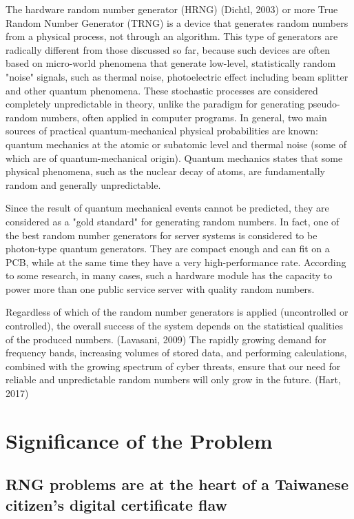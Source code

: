 \documentclass[runningheads]{llncs}
\begin{document}
The hardware random number generator (HRNG) (Dichtl, 2003) or more True Random Number Generator (TRNG) is a device that generates random numbers from a physical process, not through an algorithm. This type of generators are radically different from those discussed so far, because such devices are often based on micro-world phenomena that generate low-level, statistically random "noise" signals, such as thermal noise, photoelectric effect including beam splitter and other quantum phenomena. These stochastic processes are considered completely unpredictable in theory, unlike the paradigm for generating pseudo-random numbers, often applied in computer programs. In general, two main sources of practical quantum-mechanical physical probabilities are known: quantum mechanics at the atomic or subatomic level and thermal noise (some of which are of quantum-mechanical origin). Quantum mechanics states that some physical phenomena, such as the nuclear decay of atoms, are fundamentally random and generally unpredictable.

Since the result of quantum mechanical events cannot be predicted, they are considered as a "gold standard" for generating random numbers. In fact, one of the best random number generators for server systems is considered to be photon-type quantum generators. They are compact enough and can fit on a PCB, while at the same time they have a very high-performance rate. According to some research, in many cases, such a hardware module has the capacity to power more than one public service server with quality random numbers. 

Regardless of which of the random number generators is applied (uncontrolled or controlled), the overall success of the system depends on the statistical qualities of the produced numbers. (Lavasani, 2009) The rapidly growing demand for frequency bands, increasing volumes of stored data, and performing calculations, combined with the growing spectrum of cyber threats, ensure that our need for reliable and unpredictable random numbers will only grow in the future. (Hart, 2017) 

\section{Significance of the Problem}
\label{sec:2}

\subsection{RNG problems are at the heart of a Taiwanese citizen's digital certificate flaw}
\label{sub-sec:2-1}
\end{document}
